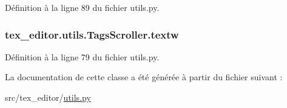 Définition à la ligne 89 du fichier utils.\+py.

\hypertarget{classtex__editor_1_1utils_1_1_tags_scroller_a19ed18ecd55f3bfe63a8d5e4717d0067}{}
\subsubsection[{textw}]{\setlength{\rightskip}{0pt plus 5cm}tex\+\_\+editor.\+utils.\+Tags\+Scroller.\+textw}\label{classtex__editor_1_1utils_1_1_tags_scroller_a19ed18ecd55f3bfe63a8d5e4717d0067}


Définition à la ligne 79 du fichier utils.\+py.



La documentation de cette classe a été générée à partir du fichier suivant \+:\begin{DoxyCompactItemize}
\item 
src/tex\+\_\+editor/\hyperlink{utils_8py}{utils.\+py}\end{DoxyCompactItemize}
